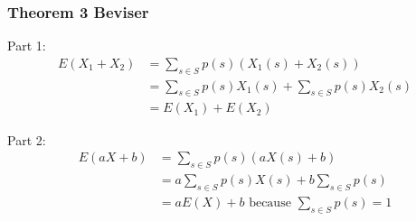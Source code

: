 \documentclass{beamer}
\begin{document}
\begin{frame}
  \frametitle{Theorem 3 Beviser}
  Part 1:
  \begin{equation}
    \begin{split}
      E(X_{1} + X_{2}) &= \sum_{s \in S}p(s) (X_{1}(s) + X_2(s)) \\
                       &= \sum_{s \in S}p(s) X_{1}(s) + \sum_{s \in S}p(s) X_{2}(s)\\
                       &= E(X_{1}) + E(X_{2})
    \end{split}
  \end{equation}

  Part 2:
  \begin{equation}
    \begin{split}
      E(aX+b) &= \sum_{s \in S}p(s)(aX(s)+b)\\
              &= a \sum_{s \in S}p(s)X(s) + b \sum_{s \in S}p(s)\\
              &= aE(X) + b \text{ because } \sum_{s \in S}p(s) = 1\\
    \end{split}
  \end{equation}
\end{frame}
\end{document}
